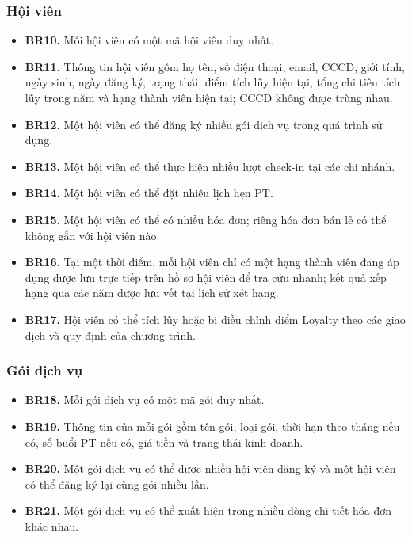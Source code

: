 \documentclass[11pt, a4paper]{article}
\begin{document}
\subsubsection{Hội viên}
\begin{itemize}
    \item \textbf{BR10.} Mỗi hội viên có một mã hội viên duy nhất.
    \item \textbf{BR11.} Thông tin hội viên gồm họ tên, số điện thoại, email, CCCD, giới tính, ngày sinh, ngày đăng ký, trạng thái, điểm tích lũy hiện tại, tổng chi tiêu tích lũy trong năm và hạng thành viên hiện tại; CCCD không được trùng nhau.
    \item \textbf{BR12.} Một hội viên có thể đăng ký nhiều gói dịch vụ trong quá trình sử dụng.
    \item \textbf{BR13.} Một hội viên có thể thực hiện nhiều lượt check-in tại các chi nhánh.
    \item \textbf{BR14.} Một hội viên có thể đặt nhiều lịch hẹn PT.
    \item \textbf{BR15.} Một hội viên có thể có nhiều hóa đơn; riêng hóa đơn bán lẻ có thể không gắn với hội viên nào.
    \item \textbf{BR16.} Tại một thời điểm, mỗi hội viên chỉ có một hạng thành viên đang áp dụng được lưu trực tiếp trên hồ sơ hội viên để tra cứu nhanh; kết quả xếp hạng qua các năm được lưu vết tại lịch sử xét hạng.
    \item \textbf{BR17.} Hội viên có thể tích lũy hoặc bị điều chỉnh điểm Loyalty theo các giao dịch và quy định của chương trình.
\end{itemize}

\subsubsection{Gói dịch vụ}
\begin{itemize}
    \item \textbf{BR18.} Mỗi gói dịch vụ có một mã gói duy nhất.
    \item \textbf{BR19.} Thông tin của mỗi gói gồm tên gói, loại gói, thời hạn theo tháng nếu có, số buổi PT nếu có, giá tiền và trạng thái kinh doanh.
    \item \textbf{BR20.} Một gói dịch vụ có thể được nhiều hội viên đăng ký và một hội viên có thể đăng ký lại cùng gói nhiều lần.
    \item \textbf{BR21.} Một gói dịch vụ có thể xuất hiện trong nhiều dòng chi tiết hóa đơn khác nhau.
\end{itemize}
\end{document}
